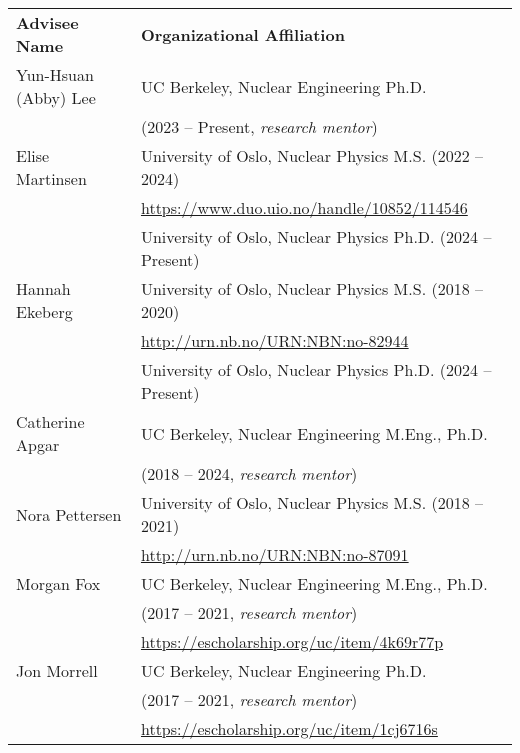\begin{longtable}{ @{} l @{\hspace{5ex}} l }
\bf{Advisee Name}   &  \bf{Organizational Affiliation}\\

Yun-Hsuan (Abby) Lee & UC Berkeley, Nuclear Engineering Ph.D. \\ & (2023 -- Present, \textit{research mentor})\\
Elise Martinsen & University of Oslo, Nuclear Physics M.S. (2022 -- 2024)\\
& \url{https://www.duo.uio.no/handle/10852/114546}\vspace{0.5mm}\\
& University of Oslo, Nuclear Physics Ph.D. (2024 -- Present)\\
Hannah Ekeberg & University of Oslo, Nuclear Physics M.S. (2018 -- 2020)\\
& \url{http://urn.nb.no/URN:NBN:no-82944}\vspace{0.5mm}\\
& University of Oslo, Nuclear Physics Ph.D. (2024 -- Present)\\
Catherine  Apgar & UC Berkeley, Nuclear Engineering M.Eng., Ph.D. \\ & (2018 -- 2024, \textit{research mentor})\\
Nora Pettersen & University of Oslo, Nuclear Physics M.S. (2018 -- 2021)\\
               & \url{http://urn.nb.no/URN:NBN:no-87091}\vspace{0.5mm}\\
Morgan  Fox & UC Berkeley, Nuclear Engineering M.Eng., Ph.D. \\ & (2017 -- 2021, \textit{research mentor})\\
                & \url{https://escholarship.org/uc/item/4k69r77p}\vspace{0.5mm}\\               
Jon  Morrell & UC Berkeley, Nuclear Engineering Ph.D. \\ & (2017 -- 2021, \textit{research mentor})\\
                & \url{https://escholarship.org/uc/item/1cj6716s}\vspace{0.5mm}\\


\end{longtable}
